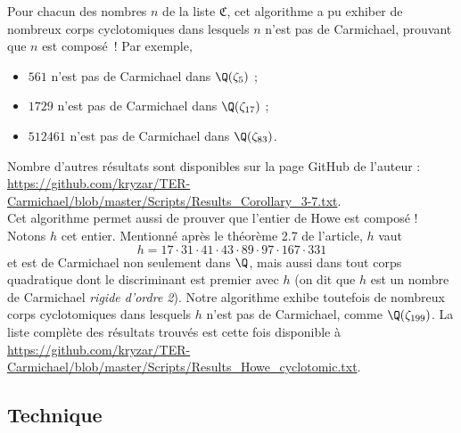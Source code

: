 Pour chacun des nombres $n$ de la liste $\mathfrak{C}$, cet algorithme a pu exhiber de nombreux corps cyclotomiques dans lesquels $n$ n'est pas de Carmichael, prouvant que $n$ est composé~! Par exemple,
\begin{itemize}
	\item $561$ n'est pas de Carmichael dans $\Q(\zeta_5)$ ; 
	\item $1729$ n'est pas de Carmichael dans $\Q(\zeta_{17})$ ;
	\item $512461$ n'est pas de Carmichael dans $\Q(\zeta_{83})$.
\end{itemize}

Nombre d'autres résultats sont disponibles sur la page GitHub de l'auteur : \url{https://github.com/kryzar/TER-Carmichael/blob/master/Scripts/Results_Corollary_3-7.txt}. \\

Cet algorithme permet aussi de prouver que l'entier de Howe est composé ! Notons $h$ cet entier. Mentionné après le théorème 2.7 de l'article, $h$ vaut $$h = 17 \cdot 31 \cdot 41 \cdot 43 \cdot 89 \cdot 97 \cdot 167 \cdot 331$$ et est de Carmichael non seulement dans $\Q$, mais aussi dans tout corps quadratique dont le discriminant est premier avec $h$ (on dit que $h$ est un nombre de Carmichael \emph{rigide d'ordre 2}). Notre algorithme exhibe toutefois de nombreux corps cyclotomiques dans lesquels $h$ n'est pas de Carmichael, comme $\Q(\zeta_{199})$. La liste complète des résultats trouvés est cette fois disponible à \url{https://github.com/kryzar/TER-Carmichael/blob/master/Scripts/Results_Howe_cyclotomic.txt}.


\subsection{Technique}
